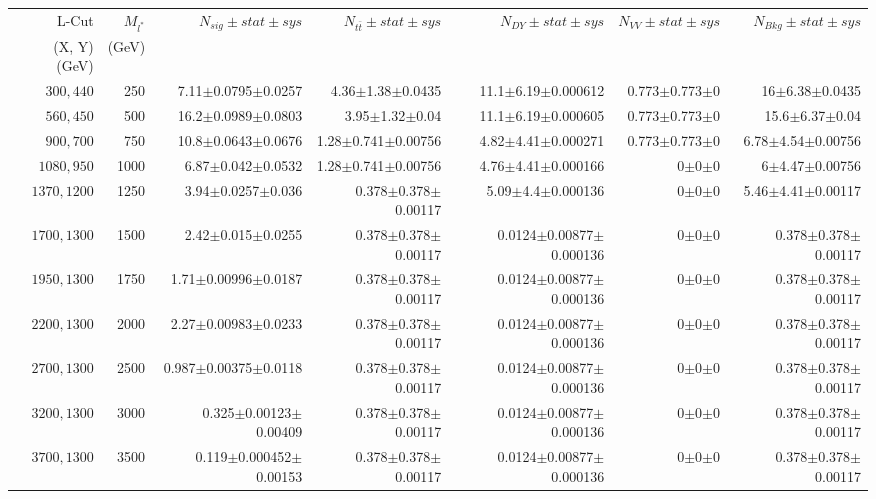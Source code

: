 \documentclass[]{article}
\begin{document}
\begin{table}
\begin{center}
\scriptsize{
\begin{tabular}{ |r|r|r|r|r|r|r|}
\hline 
L-Cut & $M_{l^*}$ & $N_{sig}\pm stat \pm sys $ &$N_{t\bar{t}}\pm stat \pm sys $ & $N_{DY}\pm stat \pm sys $ & $N_{VV}\pm stat \pm sys $ &$N_{Bkg}\pm stat \pm sys$\\
 (X, Y) (GeV) & (GeV) & && &&\\
\hline 
$300, 440$ & 250 & 7.11$\pm$0.0795$\pm$0.0257 & 4.36$\pm$1.38$\pm$0.0435 & 11.1$\pm$6.19$\pm$0.000612 & 0.773$\pm$0.773$\pm$0 & 16$\pm$6.38$\pm$0.0435 \\
$560, 450$ & 500 & 16.2$\pm$0.0989$\pm$0.0803 & 3.95$\pm$1.32$\pm$0.04 & 11.1$\pm$6.19$\pm$0.000605 & 0.773$\pm$0.773$\pm$0 & 15.6$\pm$6.37$\pm$0.04 \\
$900, 700$ & 750 & 10.8$\pm$0.0643$\pm$0.0676 & 1.28$\pm$0.741$\pm$0.00756 & 4.82$\pm$4.41$\pm$0.000271 & 0.773$\pm$0.773$\pm$0 & 6.78$\pm$4.54$\pm$0.00756 \\
$1080,950$ & 1000 & 6.87$\pm$0.042$\pm$0.0532 & 1.28$\pm$0.741$\pm$0.00756 & 4.76$\pm$4.41$\pm$0.000166 & 0$\pm$0$\pm$0 & 6$\pm$4.47$\pm$0.00756 \\
$1370,1200$ & 1250 & 3.94$\pm$0.0257$\pm$0.036 & 0.378$\pm$0.378$\pm$0.00117 & 5.09$\pm$4.4$\pm$0.000136 & 0$\pm$0$\pm$0 & 5.46$\pm$4.41$\pm$0.00117 \\
$1700,1300$ & 1500 & 2.42$\pm$0.015$\pm$0.0255 & 0.378$\pm$0.378$\pm$0.00117 & 0.0124$\pm$0.00877$\pm$0.000136 & 0$\pm$0$\pm$0 & 0.378$\pm$0.378$\pm$0.00117 \\
$1950,1300$ & 1750 & 1.71$\pm$0.00996$\pm$0.0187 & 0.378$\pm$0.378$\pm$0.00117 & 0.0124$\pm$0.00877$\pm$0.000136 & 0$\pm$0$\pm$0 & 0.378$\pm$0.378$\pm$0.00117 \\
$2200,1300$ & 2000 & 2.27$\pm$0.00983$\pm$0.0233 & 0.378$\pm$0.378$\pm$0.00117 & 0.0124$\pm$0.00877$\pm$0.000136 & 0$\pm$0$\pm$0 & 0.378$\pm$0.378$\pm$0.00117 \\
$2700,1300$ & 2500 & 0.987$\pm$0.00375$\pm$0.0118 & 0.378$\pm$0.378$\pm$0.00117 & 0.0124$\pm$0.00877$\pm$0.000136 & 0$\pm$0$\pm$0 & 0.378$\pm$0.378$\pm$0.00117 \\
$3200,1300$ & 3000 & 0.325$\pm$0.00123$\pm$0.00409 & 0.378$\pm$0.378$\pm$0.00117 & 0.0124$\pm$0.00877$\pm$0.000136 & 0$\pm$0$\pm$0 & 0.378$\pm$0.378$\pm$0.00117 \\
$3700,1300$ & 3500 & 0.119$\pm$0.000452$\pm$0.00153 & 0.378$\pm$0.378$\pm$0.00117 & 0.0124$\pm$0.00877$\pm$0.000136 & 0$\pm$0$\pm$0 & 0.378$\pm$0.378$\pm$0.00117 \\

\end{tabular}}
\end{center}
\end{table}
\end{document}
